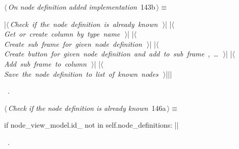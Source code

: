 \documentclass[%
    a4paper,    %
    justified,  %
    nobib,      %
    openany     %
]{tufte-book}
\begin{document}
\begin{flushleft} \small
\begin{minipage}{\linewidth}\label{scrap154}\raggedright\small
{} $\langle\,${\itshape On node definition added implementation}\nobreak\ {\footnotesize {143b}}$\,\rangle\equiv$
\vspace{-1ex}
\begin{pythoncode}
|\hbox{$\langle\,${\itshape Check if the node definition is already known}\nobreak\ {\footnotesize {}}$\,\rangle$}|
|\hbox{$\langle\,${\itshape Get or create column by type name}\nobreak\ {\footnotesize {}}$\,\rangle$}|
|\hbox{$\langle\,${\itshape Create sub frame for given node definition}\nobreak\ {\footnotesize {}}$\,\rangle$}|
|\hbox{$\langle\,${\itshape Create button for given node definition and add to sub frame}\nobreak\ {\footnotesize {}, \ldots\ }$\,\rangle$}|
|\hbox{$\langle\,${\itshape Add sub frame to column}\nobreak\ {\footnotesize {}}$\,\rangle$}|
|\hbox{$\langle\,${\itshape Save the node definition to list of known nodes}\nobreak\ {\footnotesize {}}$\,\rangle$}||\NWsep|
\end{pythoncode}
\vspace{1.5ex}
\footnotesize
\begin{list}{}{\setlength{\itemsep}{-\parsep}\setlength{\itemindent}{-\leftmargin}}
\item \NWtxtMacroRefIn\ .

\item{}
\end{list}
\end{minipage}\vspace{4ex}
\end{flushleft}
%
\begin{flushleft} \small
\begin{minipage}{\linewidth}\label{scrap155}\raggedright\small
{} $\langle\,${\itshape Check if the node definition is already known}\nobreak\ {\footnotesize {146a}}$\,\rangle\equiv$
\vspace{-1ex}
\begin{pythoncode}
if node_view_model.id_ not in self.node_definitions:
|\NWsep|
\end{pythoncode}
\vspace{1.5ex}
\footnotesize
\begin{list}{}{\setlength{\itemsep}{-\parsep}\setlength{\itemindent}{-\leftmargin}}
\item \NWtxtMacroRefIn\ .

\item{}
\end{list}
\end{minipage}\vspace{4ex}
\end{flushleft}
\end{document}
